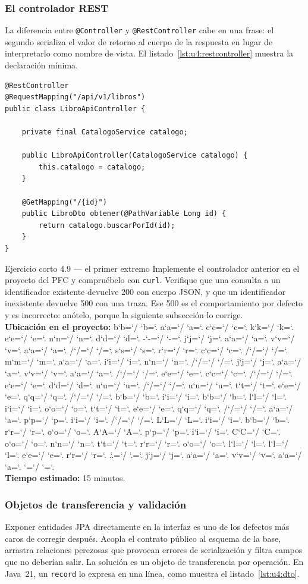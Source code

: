 \documentclass[11pt,a4paper,openany]{book}
\newcommand{\ruta}[1]{{\ttfamily\small\rutaaux #1\relax}}
\def\rutaaux{\futurelet\next\rutapaso}
\def\rutapaso{%
	\ifx\next\relax \let\sig\relax
	\else \let\sig\rutaimprime \fi \sig}
\def\rutaimprime#1{%
	#1\ifnum`#1=`/ \allowbreak\fi
	\ifnum`#1=`. \allowbreak\fi
	\rutaaux}
\begin{document}
\subsubsection{El controlador REST}

La diferencia entre \texttt{@Controller} y \texttt{@RestController} cabe en una frase: el segundo serializa el valor de retorno al cuerpo de la respuesta en lugar de interpretarlo como nombre de vista. El listado~\ref{lst:u4:restcontroller} muestra la declaración mínima.

\begin{lstlisting}[style=java,caption={Controlador REST minimo que devuelve una representacion JSON.},label={lst:u4:restcontroller}]
@RestController
@RequestMapping("/api/v1/libros")
public class LibroApiController {

	private final CatalogoService catalogo;

	public LibroApiController(CatalogoService catalogo) {
		this.catalogo = catalogo;
	}

	@GetMapping("/{id}")
	public LibroDto obtener(@PathVariable Long id) {
		return catalogo.buscarPorId(id);
	}
}
\end{lstlisting}

\begin{cajaejercicio}{Ejercicio corto 4.9 --- el primer extremo}
	Implemente el controlador anterior en el proyecto del PFC y compruébelo con \texttt{curl}. Verifique que una consulta a un identificador existente devuelve 200 con cuerpo JSON, y que un identificador inexistente devuelve 500 con una traza. Ese 500 es el comportamiento por defecto y es incorrecto: anótelo, porque la siguiente subsección lo corrige.\\[3pt]
	\textbf{Ubicación en el proyecto:} \ruta{backend-java/src/main/java/ec/edu/uteq/biblioteq/api/LibroApiController.java}\\[3pt]
	\textbf{Tiempo estimado:} 15 minutos.
\end{cajaejercicio}

\subsubsection{Objetos de transferencia y validación}

Exponer entidades JPA directamente en la interfaz es uno de los defectos más caros de corregir después. Acopla el contrato público al esquema de la base, arrastra relaciones perezosas que provocan errores de serialización y filtra campos que no deberían salir. La solución es un objeto de transferencia por operación. En Java~21, un \texttt{record} lo expresa en una línea, como muestra el listado~\ref{lst:u4:dto}.
\end{document}
